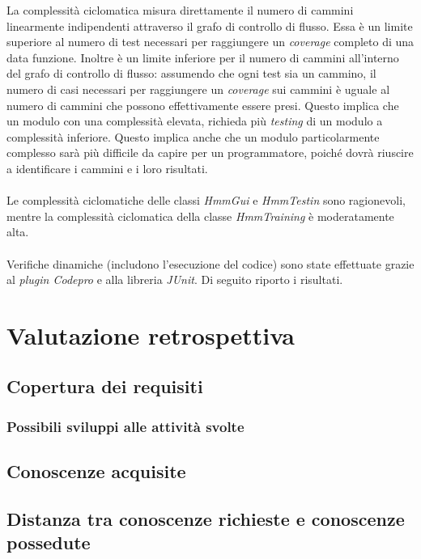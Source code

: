 La complessità ciclomatica misura direttamente il numero di cammini linearmente indipendenti attraverso il grafo di controllo di flusso. Essa è un limite superiore al numero di test necessari per raggiungere un \emph{coverage} completo di una data funzione. Inoltre è un limite inferiore per il numero di cammini all'interno del grafo di controllo di flusso: assumendo che ogni test sia un cammino, il numero di casi necessari per raggiungere un \emph{coverage} sui cammini è uguale al numero di cammini che possono effettivamente essere presi. Questo implica che un modulo con una complessità elevata, richieda più \emph{testing} di un modulo a complessità inferiore. Questo implica anche che un modulo particolarmente complesso sarà più difficile da capire per un programmatore, poiché dovrà riuscire a identificare i cammini e i loro risultati.\\\\Le complessità ciclomatiche delle classi \emph{HmmGui} e \emph{HmmTestin} sono ragionevoli, mentre la complessità ciclomatica della classe \emph{HmmTraining} è moderatamente alta.\\\\Verifiche dinamiche (includono l'esecuzione del codice) sono state effettuate grazie al \emph{plugin Codepro} e alla libreria \emph{JUnit}. Di seguito riporto i risultati.
\newpage
\section{Valutazione retrospettiva}
\label{4.0}

\subsection{Copertura dei requisiti}
\label{4.1}

\subsubsection{Possibili sviluppi alle attività svolte}
\subsection{Conoscenze acquisite}

\label{4.2}
\subsection{Distanza tra conoscenze richieste e conoscenze possedute}

